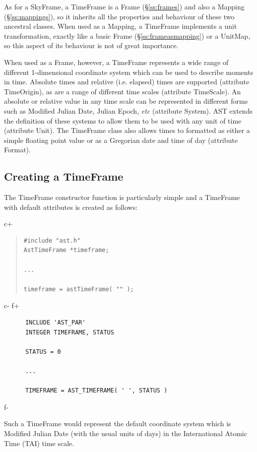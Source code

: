 \documentclass[twoside,11pt]{article}
\newcommand{\secref}[1]{\S\ref{#1}}
\newcommand{\secref}[1]{\ref{#1}}
\begin{document}
As for a SkyFrame, a TimeFrame is a Frame (\secref{ss:frames}) and also a
Mapping (\secref{ss:mappings}), so it inherits all the properties and
behaviour of these two ancestral classes.  When used as a Mapping, a
TimeFrame implements a unit transformation, exactly like a basic Frame
(\secref{ss:frameasmapping}) or a UnitMap, so this aspect of its
behaviour is not of great importance.

When used as a Frame, however, a TimeFrame represents a wide range of
different 1-dimensional coordinate system which can be used to describe
moments in time. Absolute times and relative (i.e. elapsed) times are
supported (attribute TimeOrigin), as are a range of different time scales
(attribute TimeScale). An absolute or relative value in any time scale can
be represented in different forms such as Modified Julian Date, Julian Epoch,
\emph{etc} (attribute System). AST extends the definition of these systems to
allow them to be used with any unit of time (attribute Unit). The TimeFrame
class also allows times to formatted as either a simple floating point value
or as a Gregorian date and time of day (attribute Format).

\subsection{Creating a TimeFrame}

The TimeFrame constructor function is particularly simple and a
TimeFrame with default attributes is created as follows:

c+
\begin{quote}
\small
\begin{verbatim}
#include "ast.h"
AstTimeFrame *timeframe;

...

timeframe = astTimeFrame( "" );
\end{verbatim}
\normalsize
\end{quote}
c-
f+
\small
\begin{verbatim}
      INCLUDE 'AST_PAR'
      INTEGER TIMEFRAME, STATUS

      STATUS = 0

      ...

      TIMEFRAME = AST_TIMEFRAME( ' ', STATUS )
\end{verbatim}
\normalsize
f-

Such a TimeFrame would represent the default coordinate system which is
Modified Julian Date (with the usual units of days) in the International
Atomic Time (TAI) time scale.
\end{document}
